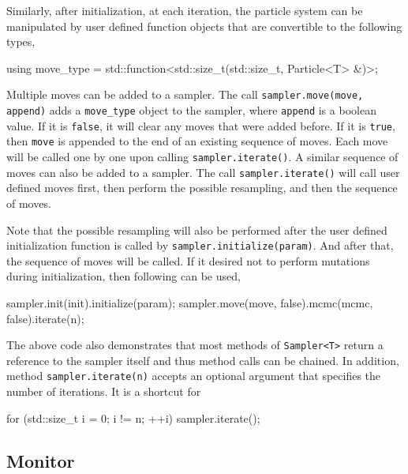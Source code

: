 Similarly, after initialization, at each iteration, the particle system can be
manipulated by user defined function objects that are convertible to the
following types,
\begin{cppcode}
  using move_type = std::function<std::size_t(std::size_t, Particle<T> &)>;
\end{cppcode}
Multiple moves can be added to a sampler. The call
\verb|sampler.move(move, append)| adds a \verb|move_type| object to the
sampler, where \verb|append| is a boolean value. If it is \verb|false|, it will
clear any moves that were added before. If it is \verb|true|, then \verb|move|
is appended to the end of an existing sequence of moves. Each move will be
called one by one upon calling \verb|sampler.iterate()|. A similar sequence of
\mcmc moves can also be added to a sampler. The call \verb|sampler.iterate()|
will call user defined moves first, then perform the possible resampling, and
then the sequence of \mcmc moves.

Note that the possible resampling will also be performed after the user defined
initialization function is called by \verb|sampler.initialize(param)|. And
after that, the sequence of \mcmc moves will be called. If it desired not to
perform mutations during initialization, then following can be used,
\begin{cppcode}
  sampler.init(init).initialize(param);
  sampler.move(move, false).mcmc(mcmc, false).iterate(n);
\end{cppcode}
The above code also demonstrates that most methods of \verb|Sampler<T>| return
a reference to the sampler itself and thus method calls can be chained. In
addition, method \verb|sampler.iterate(n)| accepts an optional argument that
specifies the number of iterations. It is a shortcut for
\begin{cppcode}
  for (std::size_t i = 0; i != n; ++i)
      sampler.iterate();
\end{cppcode}

\subsection{Monitor}
\label{sub:Monitor}

